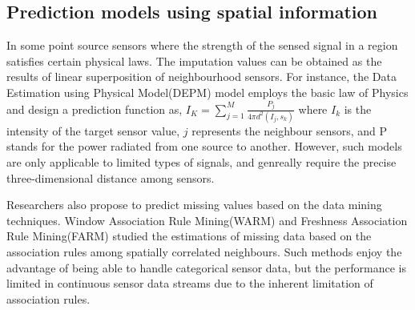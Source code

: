 \subsection{Prediction models using spatial information}
In some point source sensors where the strength of the sensed signal in a region satisfies certain physical laws. The imputation values can be obtained as the results of linear superposition of neighbourhood sensors. 
For instance, the Data Estimation using Physical Model(DEPM)\cite{li2008data} model employs the basic law of Physics and design a prediction function as,  
$I_K =\sum_{j=1}^M\frac{P_j}{4\pi d^2(I_j,s_k)}$
where $I_k$ is the intensity of the target sensor value, $j$ represents the neighbour sensors, and P stands for the power radiated from one source to another. 
However, such models are only applicable to limited types of signals, and genreally require the precise three-dimensional distance among sensors.

Researchers also propose to predict missing values based on the data mining techniques. Window Association Rule Mining(WARM)\cite{le2005estimating} and Freshness Association Rule Mining(FARM)\cite{Gruenwald:FARM} studied the estimations of missing data based on the association rules among spatially correlated neighbours. 
Such methods enjoy the advantage of being able to handle categorical sensor data, but the performance is limited in continuous sensor data streams due to the inherent limitation of association rules. 


